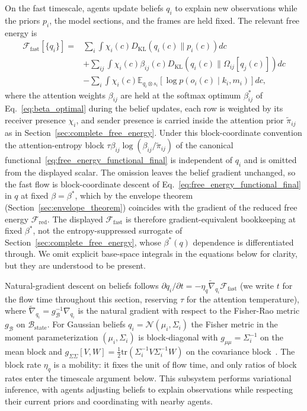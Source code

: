 \documentclass[11pt]{article}
\begin{document}
On the fast timescale, agents update beliefs $q_i$ to explain new observations while the priors $p_i$, the model sections, and the frames are held fixed. The relevant free energy is
\begin{align}
\mathcal{F}_{\text{fast}}[\{q_i\}] = {}& \sum_i \int \chi_i(c)  D_{\mathrm{KL}}(q_i(c) \| p_i(c))  dc \nonumber\\
&+ \sum_{ij} \int \chi_i(c)\beta_{ij}(c)  D_{\mathrm{KL}}(q_i(c) \| \Omega_{ij}[q_j(c)])  dc \nonumber\\
&- \sum_i \int \chi_i(c)  \mathbb{E}_{q_i\otimes s_i}[\log p(o_i(c) \mid k_i, m_i)]  dc,
\end{align}
where the attention weights $\beta_{ij}$ are held at the softmax optimum $\beta^*_{ij}$ of Eq.~\eqref{eq:beta_optimal} during the belief updates, each row is weighted by its receiver presence $\chi_i$, and sender presence is carried inside the attention prior $\tilde{\pi}_{ij}$ as in Section~\ref{sec:complete_free_energy}. Under this block-coordinate convention the attention-entropy block $\tau\beta_{ij}\log(\beta_{ij}/\tilde{\pi}_{ij})$ of the canonical functional~\eqref{eq:free_energy_functional_final} is independent of $q_i$ and is omitted from the displayed scalar. The omission leaves the belief gradient unchanged, so the fast flow is block-coordinate descent of Eq.~\eqref{eq:free_energy_functional_final} in $q$ at fixed $\beta = \beta^*$, which by the envelope theorem (Section~\ref{sec:envelope_theorem}) coincides with the gradient of the reduced free energy $\mathcal{F}_{\mathrm{red}}$. The displayed $\mathcal{F}_{\text{fast}}$ is therefore gradient-equivalent bookkeeping at fixed $\beta^*$, not the entropy-suppressed surrogate of Section~\ref{sec:complete_free_energy}, whose $\beta^*(q)$ dependence is differentiated through. We omit explicit base-space integrals in the equations below for clarity, but they are understood to be present.

Natural-gradient descent on beliefs follows $\partial q_i/\partial t = -\eta_q  \tilde{\nabla}_{q_i} \mathcal{F}_{\text{fast}}$ (we write $t$ for the flow time throughout this section, reserving $\tau$ for the attention temperature), where $\tilde{\nabla}_{q_i} = g_{\mathcal{B}}^{-1} \nabla_{q_i}$ is the natural gradient with respect to the Fisher-Rao metric $g_{\mathcal{B}}$ on $\mathcal{B}_{\mathrm{state}}$. For Gaussian beliefs $q_i = \mathcal{N}(\mu_i, \Sigma_i)$ the Fisher metric in the moment parameterization $(\mu_i, \Sigma_i)$ is block-diagonal with $g_{\mu\mu} = \Sigma_i^{-1}$ on the mean block and $g_{\Sigma\Sigma}[V, W] = \tfrac{1}{2}\mathrm{tr}(\Sigma_i^{-1} V \Sigma_i^{-1} W)$ on the covariance block~\cite{Amari2016}. The block rate $\eta_q$ is a mobility: it fixes the unit of flow time, and only ratios of block rates enter the timescale argument below. This subsystem performs variational inference, with agents adjusting beliefs to explain observations while respecting their current priors and coordinating with nearby agents.
\end{document}

